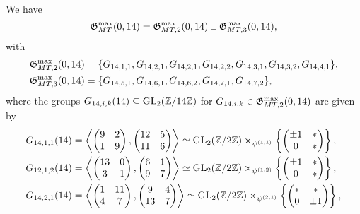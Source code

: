 We have 
\[
\mathfrak{G}_{MT}^{\max}(0,14) = \mathfrak{G}_{MT,2}^{\max}(0,14) \sqcup \mathfrak{G}_{MT,3}^{\max}(0,14),
\] 
with
\[
\begin{split}
\mathfrak{G}_{MT,2}^{\max}(0,14) &= \{ G_{14,1,1}, G_{14,2,1}, G_{14,2,1}, G_{14,2,2}, G_{14,3,1}, G_{14,3,2}, G_{14,4,1} \}, \\
\mathfrak{G}_{MT,3}^{\max}(0,14) &= \{ G_{14,5,1}, G_{14,6,1}, G_{14,6,2}, G_{14,7,1}, G_{14,7,2} \}, 
\end{split}
\]
where the groups $G_{14,i,k}(14) \subseteq \operatorname{GL}_2(\mathbb{Z}/14\mathbb{Z})$ for $G_{14,i,k} \in \mathfrak{G}_{MT,2}^{\max}(0,14)$ are given by
\begin{equation} \label{descriptionofgroupslevel14withquadraticfibering}
\begin{split}
G_{14,1,1}(14) &= \left\langle \begin{pmatrix} 9 & 2 \\ 1 & 9 \end{pmatrix}, \begin{pmatrix} 12 & 5 \\ 11 & 6 \end{pmatrix} \right\rangle\simeq \GL_2(\mbz/2\mbz) \times_{\psi^{(1,1)}} \left\{ \begin{pmatrix} \pm 1 & * \\ 0 & * \end{pmatrix} \right\}, \\
G_{12,1,2}(14) &= \left\langle \begin{pmatrix} 13 & 0 \\ 3 & 1 \end{pmatrix}, \begin{pmatrix} 6 & 1 \\ 9 & 7 \end{pmatrix} \right\rangle \simeq \GL_2(\mbz/2\mbz) \times_{\psi^{(1,2)}} \left\{ \begin{pmatrix} \pm 1 & * \\ 0 & * \end{pmatrix} \right\}, \\
G_{14,2,1}(14) &= \left\langle \begin{pmatrix} 1 & 11 \\ 4 & 7 \end{pmatrix}, \begin{pmatrix} 9 & 4 \\ 13 & 7 \end{pmatrix} \right\rangle \simeq \GL_2(\mbz/2\mbz) \times_{\psi^{(2,1)}} \left\{ \begin{pmatrix} * & * \\ 0 & \pm 1 \end{pmatrix} \right\}, \\

\end{split}
\end{equation}
